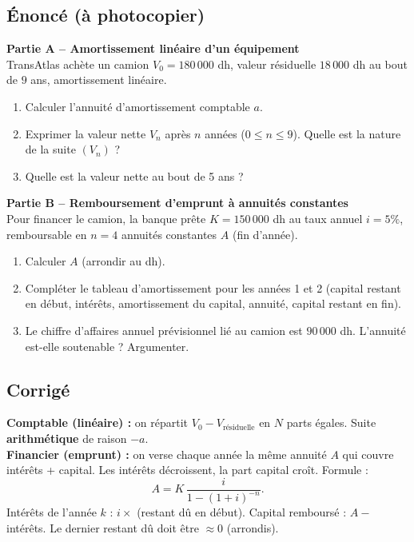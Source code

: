 \documentclass[12pt,a4paper]{article}
\begin{document}
\subsection{Énoncé (à photocopier)}

\begin{exobox}
\textbf{Partie A -- Amortissement linéaire d'un équipement}\\
TransAtlas achète un camion $V_0=180\,000$ dh, valeur résiduelle $18\,000$ dh au bout de $9$ ans, amortissement linéaire.
\begin{enumerate}[label=\alph*)]
  \item Calculer l'annuité d'amortissement comptable $a$.
  \item Exprimer la valeur nette $V_n$ après $n$ années ($0\leqslant n\leqslant 9$). Quelle est la nature de la suite $(V_n)$ ?
  \item Quelle est la valeur nette au bout de 5 ans ?
\end{enumerate}

\textbf{Partie B -- Remboursement d'emprunt à annuités constantes}\\
Pour financer le camion, la banque prête $K=150\,000$ dh au taux annuel $i=5\%$, remboursable en $n=4$ annuités constantes $A$ (fin d'année).
\begin{enumerate}[label=\alph*), resume]
  \item Calculer $A$ (arrondir au dh).
  \item Compléter le tableau d'amortissement pour les années 1 et 2 (capital restant en début, intérêts, amortissement du capital, annuité, capital restant en fin).
  \item Le chiffre d'affaires annuel prévisionnel lié au camion est $90\,000$ dh. L'annuité est-elle soutenable ? Argumenter.
\end{enumerate}
\end{exobox}

\subsection{Corrigé}

\begin{methodebox}
\textbf{Comptable (linéaire) :} on répartit $V_0-V_{\text{résiduelle}}$ en $N$ parts égales. Suite \textbf{arithmétique} de raison $-a$.\\
\textbf{Financier (emprunt) :} on verse chaque année la même annuité $A$ qui couvre intérêts + capital. Les intérêts décroissent, la part capital croît. Formule :
$$A = K\,\frac{i}{1-(1+i)^{-n}}.$$
Intérêts de l'année $k$ : $i\times$ (restant dû en début). Capital remboursé : $A-$ intérêts. Le dernier restant dû doit être $\approx 0$ (arrondis).
\end{methodebox}
\end{document}
